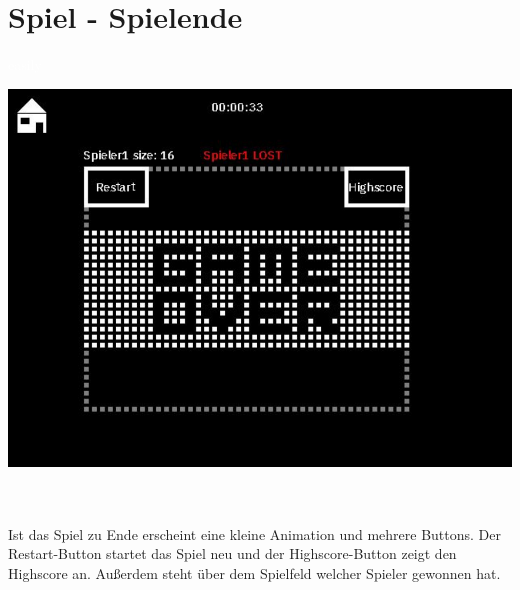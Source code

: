 \section{Spiel - Spielende}
\label{Spiel_-_Spielende}
%
\textcolor{white}{easily}
\newline 
\begin{minipage}[X]{1.1\textwidth}
 \centering
 \includegraphics[scale=0.5]{bilder/Spielende}
 \label{fig:spielende}
\end{minipage}
\\ \\ 
	Ist das Spiel zu Ende erscheint eine kleine Animation und mehrere Buttons. Der Restart-Button startet das Spiel neu und der Highscore-Button zeigt den Highscore an. Au{\ss}erdem steht {\"u}ber dem Spielfeld welcher Spieler gewonnen hat.  

%